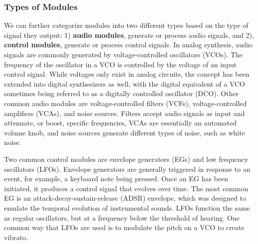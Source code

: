 \subsubsection{Types of Modules}
We can further categorize modules into two different types based on the type of signal they output: 1) \textbf{audio modules}, generate or process audio signals, and 2), \textbf{control modules}, generate or process control signals. In analog synthesis, audio signals are commonly generated by voltage-controlled oscillators (VCOs). The frequency of the oscillator in a VCO is controlled by the voltage of an input control signal. While voltages only exist in analog circuits, the concept has been extended into digital synthesizers as well, with the digital equivalent of a VCO sometimes being referred to as a digitally controlled oscillator (DCO). Other common audio modules are voltage-controlled filters (VCFs), voltage-controlled amplifiers (VCAs), and noise sources. Filters accept audio signals as input and attenuate, or boost, specific frequencies, VCAs are essentially an automated volume knob, and noise sources generate different types of noise, such as white noise.

Two common control modules are envelope generators (EGs) and low frequency oscillators (LFOs). Envelope generators are generally triggered in response to an event, for example,  a keyboard note being pressed. Once an EG has been initiated, it produces a control signal that evolves over time. The most common EG is an attack-decay-sustain-release (ADSR) envelope, which was designed to emulate the temporal evolution of instrumental sounds.  %
LFOs function the same as regular oscillators, but at a frequency below the threshold of hearing. One common way that LFOs are used is to modulate the pitch on a VCO to create vibrato.

